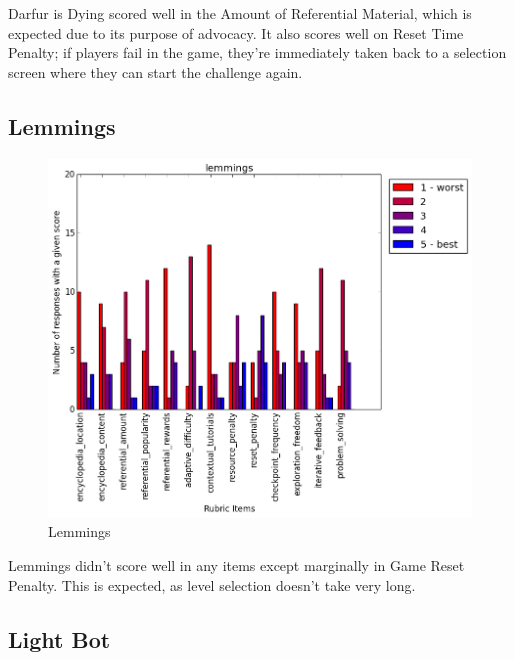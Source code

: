 				Darfur is Dying scored well in the Amount of Referential Material, which is expected due to its purpose of advocacy. It also scores well on Reset Time Penalty; if players fail in the game, they're immediately taken back to a selection screen where they can start the challenge again.

			\subsection{Lemmings}

				\begin{figure}[] 
				\centering 
				\includegraphics[width=\textwidth, height=.4\textheight, keepaspectratio=true]{lemmings_scores.png} 
				\caption{Lemmings}
				\end{figure}

				Lemmings didn't score well in any items except marginally in Game Reset Penalty. This is expected, as level selection doesn't take very long.

			\subsection{Light Bot}

